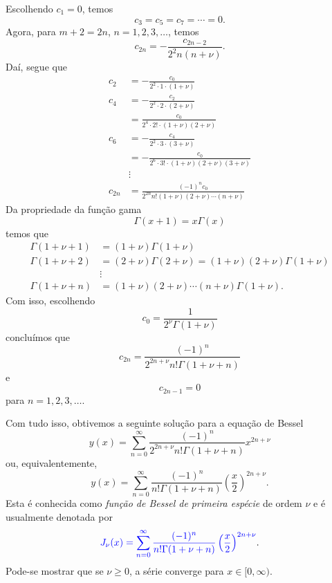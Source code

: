 Escolhendo $c_1=0$, temos
\begin{equation}
  c_3=c_5=c_7=\cdots=0.
\end{equation}
Agora, para $m+2=2n$, $n=1,2,3,\ldots$, temos
\begin{equation}
  c_{2n} = -\frac{c_{2n-2}}{2^2n(n+\nu)}.
\end{equation}
Daí, segue que
\begin{align}
  c_2 &= -\frac{c_0}{2^2\cdot 1\cdot (1+\nu)}\\
  c_4 &= -\frac{c_2}{2^2\cdot 2\cdot (2+\nu)}\\
      &= \frac{c_0}{2^4\cdot 2!\cdot (1+\nu)(2+\nu)}\\
  c_6 &= -\frac{c_4}{2^2\cdot 3\cdot (3+\nu)}\\
      &= -\frac{c_0}{2^6\cdot 3!\cdot (1+\nu)(2+\nu)(3+\nu)}\\
      &\vdots\\
  c_{2n} &= \frac{(-1)^nc_0}{2^{2n}n!(1+\nu)(2+\nu)\cdots(n+\nu)}
\end{align}
Da propriedade da função gama
\begin{equation}
  \Gamma(x+1) = x\Gamma(x)
\end{equation}
temos que
\begin{align}
  \Gamma(1+\nu+1) &= (1+\nu)\Gamma(1+\nu)\\
  \Gamma(1+\nu+2) &= (2+\nu)\Gamma(2+\nu)=(1+\nu)(2+\nu)\Gamma(1+\nu)\\
                &\vdots\\
  \Gamma(1+\nu+n) &= (1+\nu)(2+\nu)\cdots(n+\nu)\Gamma(1+\nu). 
\end{align}
Com isso, escolhendo
\begin{equation}
  c_0 = \frac{1}{2^\nu\Gamma(1+\nu)}
\end{equation}
concluímos que
\begin{equation}
  c_{2n} = \frac{(-1)^n}{2^{2n+\nu}n!\Gamma(1+\nu+n)}
\end{equation}
e
\begin{equation}
  c_{2n-1}=0
\end{equation}
para $n=1,2,3,\ldots$.

Com tudo isso, obtivemos a seguinte solução para a equação de Bessel
\begin{equation}
  y(x) = \sum_{n=0}^\infty \frac{(-1)^n}{2^{2n+\nu}n!\Gamma(1+\nu+n)}x^{2n+\nu}
\end{equation}
ou, equivalentemente,
\begin{equation}
  y(x) = \sum_{n=0}^\infty \frac{(-1)^n}{n!\Gamma(1+\nu+n)}\left(\frac{x}{2}\right)^{2n+\nu}.
\end{equation}
Esta é conhecida como \emph{função de Bessel de primeira espécie} de ordem $\nu$ e é usualmente denotada por
\begin{equation}\label{eq:bessel-1esp-nu}
  {\color{blue}J_\nu(x) = \sum_{n=0}^\infty \frac{(-1)^n}{n!\Gamma(1+\nu+n)}\left(\frac{x}{2}\right)^{2n+\nu}}. 
\end{equation}
Pode-se mostrar que se $\nu\geq 0$, a série converge para $x\in [0, \infty)$.

